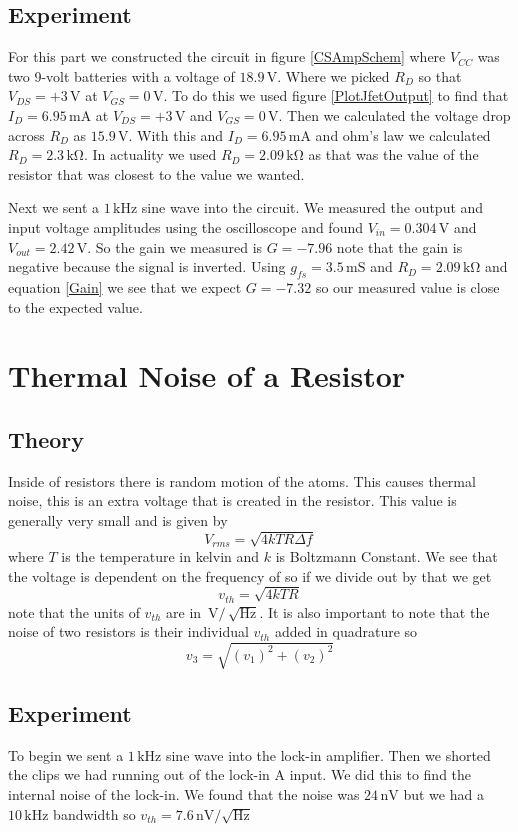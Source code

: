 \documentclass[11pt]{article}
\numberwithin{equation}{section}
\numberwithin{figure}{section}
\numberwithin{table}{section}
\newcommand{\unit}[1]{\ensuremath{\, \mathrm{#1}}}
\begin{document}
\subsection{Experiment}
For this part we constructed the circuit in figure \ref{CSAmpSchem} where $V_{CC}$ was two 9-volt batteries with a voltage of $18.9\unit{V}$. Where we picked $R_D$ so that $V_{DS}=+3\unit{V}$ at $V_{GS}=0\unit{V}$. To do this we used figure \ref{PlotJfetOutput} to find that $I_D = 6.95\unit{mA}$ at $V_{DS}=+3\unit{V}$ and $V_{GS}=0\unit{V}$. Then we calculated the voltage drop across $R_D$ as $15.9\unit{V}$. With this and $I_D=6.95\unit{mA}$ and ohm's law we calculated $R_D=2.3\unit{k\Omega}$. In actuality we used $R_D=2.09\unit{k\Omega}$ as that was the value of the resistor that was closest to the value we wanted. 

Next we sent a $1\unit{kHz}$ sine wave into the circuit. We measured the output and input voltage amplitudes using the oscilloscope and found $V_{in} = 0.304\unit{V}$ and $V_{out}=2.42\unit{V}$. So the gain we measured is $G=-7.96$ note that the gain is negative because the signal is inverted. Using $g_{fs}=3.5\unit{mS}$ and $R_D=2.09\unit{k\Omega}$ and equation \ref{Gain} we see that we expect $G=-7.32$ so our measured value is close to the expected value. 

\section{Thermal Noise of a Resistor}
\subsection{Theory}
Inside of resistors there is random motion of the atoms. This causes thermal noise, this is an extra voltage that is created in the resistor. This value is generally very small and is given by
$$V_{rms} = \sqrt{4kTR\Delta f}$$
where $T$ is the temperature in kelvin and $k$ is Boltzmann Constant. We see that the voltage is dependent on the frequency of so if we divide out by that we get
\begin{equation}
v_{th} = \sqrt{4kTR}
\label{Noise}
\end{equation}
note that the units of $v_{th}$ are in $\unit{V}/\unit{\sqrt{Hz}}$. It is also important to note that the noise of two resistors is their individual $v_{th}$ added in quadrature so
$$v_3 = \sqrt{(v_1)^2+(v_2)^2}$$


\subsection{Experiment}
To begin we sent a $1\unit{kHz}$ sine wave into the lock-in amplifier. Then we shorted the clips we had running out of the lock-in A input. We did this to find the internal noise of the lock-in. We found that the noise was $24\unit{nV}$ but we had a $10\unit{kHz}$ bandwidth so $v_{th} = 7.6\unit{nV/\sqrt{Hz}}$
\end{document}
